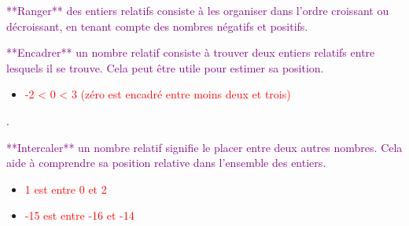\documentclass{article}
\begin{document}
\textcolor{purple}{**Ranger** des entiers relatifs consiste à les organiser dans l'ordre croissant ou décroissant, en tenant compte des nombres négatifs et positifs.}

\vspace{0.35cm}

\textcolor{purple}{**Encadrer** un nombre relatif consiste à trouver deux entiers relatifs entre lesquels il se trouve. Cela peut être utile pour estimer sa position.}

\vspace{0.4cm}

\begin{tcolorbox}[colback=orange!10!white, colframe=orange!75!black, title=\textcolor{white}{Exemples}, sharp corners=southwest]

\begin{itemize}
    \item \textcolor{red}{-2 < 0 < 3 (zéro est encadré entre moins deux et trois)}
\end{itemize}.
\end{tcolorbox}

\textcolor{purple}{**Intercaler** un nombre relatif signifie le placer entre deux autres nombres. Cela aide à comprendre sa position relative dans l'ensemble des entiers.}

\vspace{0.4cm}

\begin{tcolorbox}[colback=orange!10!white, colframe=orange!75!black, title=\textcolor{white}{Exemples}, sharp corners=southwest]

\begin{itemize}
    \item \textcolor{red}{1 est entre 0 et 2}
    \item \textcolor{red}{-15 est entre -16 et -14}
\end{itemize}
\end{tcolorbox}
\end{document}
